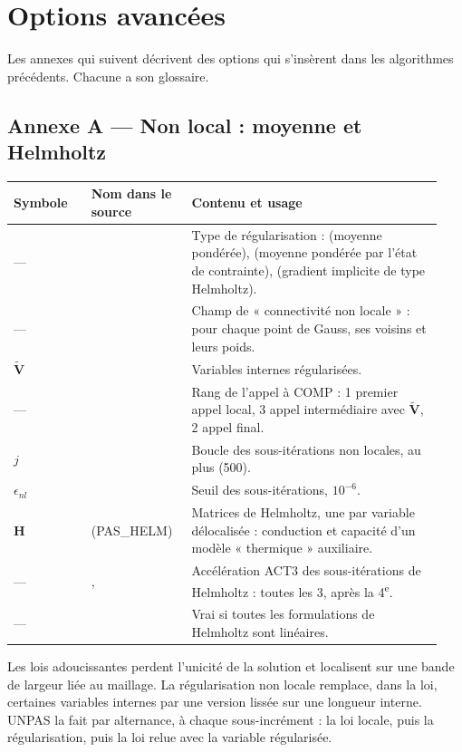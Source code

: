 \documentclass[11pt,a4paper]{article}
\makeatletter
\numberwithin{equation}{section}
\newcommand{\src}[1]{\texttt{\detokenize{#1}}}          %
\newcommand{\pr}[1]{\textsf{#1}}                        %
\newcommand{\op}[1]{\textsf{\small #1}}                 %
\newcommand{\vc}[1]{\symbf{#1}}                         %
\newenvironment{glossaire}[1][Glossaire]{%
  \par\smallskip\needspace{7\baselineskip}\noindent{\sffamily\bfseries\small #1}\par\nopagebreak
  \small
  \renewcommand{\arraystretch}{1.18}
  \begin{longtable}{@{}>{\raggedright\arraybackslash}p{0.17\linewidth}
                     >{\raggedright\arraybackslash}p{0.22\linewidth}
                     >{\raggedright\arraybackslash}p{0.555\linewidth}@{}}
  \toprule
  \textbf{Symbole} & \textbf{Nom dans le source} & \textbf{Contenu et usage}\\
  \midrule\endhead
  \bottomrule\endfoot}
  {\end{longtable}\addtocounter{table}{-1}\normalsize\vspace{-0.4em}}
\makeatother
\begin{document}
\section{Options avancées}
\label{sec:annexes}

Les annexes qui suivent décrivent des options qui s'insèrent dans les algorithmes précédents.
Chacune a son glossaire.

\subsection{Annexe A — Non local : moyenne et Helmholtz}

\begin{glossaire}
— & \src{NON_LOCAL} & Type de régularisation : \src{MOYE} (moyenne pondérée), \src{SB} (moyenne pondérée par l'état de contrainte), \src{HELM} (gradient implicite de type Helmholtz).\\
— & \src{CONN} & Champ de « connectivité non locale » : pour chaque point de Gauss, ses voisins et leurs poids.\\
$\tilde{\vc V}$ & \src{ZVARN} & Variables internes régularisées.\\
— & \src{ISTEP} & Rang de l'appel à \op{COMP} : 1 premier appel local, 3 appel intermédiaire avec $\tilde{\vc V}$, 2 appel final.\\
$j$ & \src{BIHL} & Boucle des sous-itérations non locales, au plus \src{MAXSOUSITERATION} (500).\\
$\epsilon_{nl}$ & \src{PRECSOUSITERATION} & Seuil des sous-itérations, $10^{-6}$.\\
$\vc H$ & \src{TAHELM} (\pr{PAS\_HELM}) & Matrices de Helmholtz, une par variable délocalisée : conduction et capacité d'un modèle « thermique » auxiliaire.\\
— & \src{ZNACCEHL}, \src{ITDEPHL} & Accélération \op{ACT3} des sous-itérations de Helmholtz : toutes les 3, après la 4\textsuperscript{e}.\\
— & \src{LOGHLIN} & Vrai si toutes les formulations de Helmholtz sont linéaires.\\
\end{glossaire}

Les lois adoucissantes perdent l'unicité de la solution et localisent sur une bande de largeur liée au maillage.
La régularisation non locale remplace, dans la loi, certaines variables internes par une version lissée sur une longueur interne.
\pr{UNPAS} la fait par alternance, à chaque sous-incrément : la loi locale, puis la régularisation, puis la loi relue avec la variable régularisée.
\end{document}
